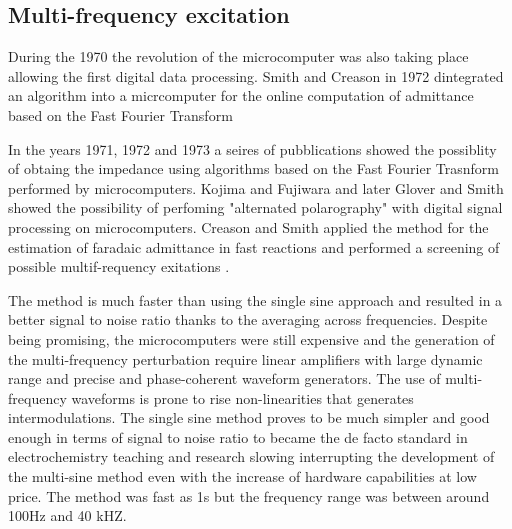 \subsection{Multi-frequency excitation}
During the 1970 the revolution of the microcomputer was also taking place allowing the first digital data processing. Smith and Creason in 1972 dintegrated an algorithm into a micrcomputer for the online computation of admittance based on the Fast Fourier Transform 

In the years 1971, 1972 and 1973 a seires of pubblications showed the possiblity of obtaing the impedance using algorithms based on the Fast Fourier Trasnform performed by microcomputers. Kojima and Fujiwara \cite{kojima1971fourier} and later Glover and Smith \cite{gloverAlternatingCurrentPolarography1973} showed the possibility of perfoming "alternated polarography" with digital signal processing on microcomputers. Creason and Smith applied the method for the estimation of faradaic admittance in fast reactions \cite{creasonFourierTransformFaradaic1972} and performed a screening of possible multif-requency exitations \cite{creasonFourierTransformFaradaic1973a}.

The method is much faster than using the single sine approach and resulted in a better signal to noise ratio thanks to the averaging across frequencies. 
Despite being promising, the microcomputers were still expensive and the generation of the multi-frequency perturbation require linear amplifiers with large dynamic range and precise and phase-coherent waveform generators. The use of multi-frequency waveforms is prone to rise non-linearities that generates intermodulations. The single sine method proves to be much simpler and good enough in terms of signal to noise ratio to became the de facto standard in electrochemistry teaching and research slowing interrupting the development of the multi-sine method even with the increase of hardware capabilities at low price. The method was fast as 1s but the frequency range was between around 100Hz and 40 kHZ.

